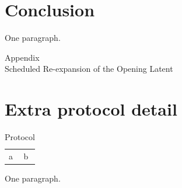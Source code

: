 \documentclass{article}
\newcommand{\papertitle}{Scheduled Re-expansion of the Opening Latent}
\begin{document}
\section{Conclusion}\label{sec:conc}
One paragraph.
\clearpage
\appendix
\begin{center}
{\Large Appendix}\\[7pt]
{\large\papertitle}
\end{center}
\setcounter{figure}{0}\setcounter{table}{0}
\section{Extra protocol detail}\label{app:extra}
\begin{table}[t]\caption{Protocol}\begin{tabular}{ll}a&b\end{tabular}\end{table}
One paragraph.
\end{document}
